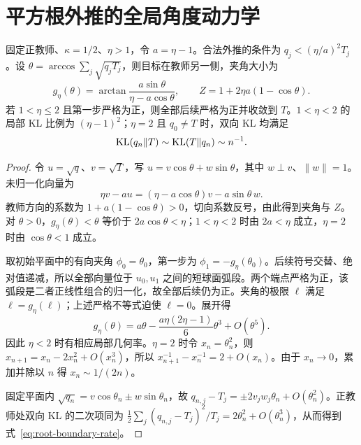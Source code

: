 \section{平方根外推的全局角度动力学}
\label{sec:root-extrapolation}
\begin{theorem}[平方根外推的角度映射与收敛]
\label{thm:root-extrapolation}
固定正教师、$\kappa=1/2$、$\eta>1$，令 $a=\eta-1$。合法外推的条件为 $q_j<(\eta/a)^2T_j$。设 $\theta=\arccos\sum_j\sqrt{q_jT_j}$，则目标在教师另一侧，夹角大小为
\begin{equation}
g_\eta(\theta)=\arctan\frac{a\sin\theta}{\eta-a\cos\theta},\qquad
Z=1+2\eta a(1-\cos\theta).
\label{eq:root-extrapolation-angle}
\end{equation}
若 $1<\eta\le2$ 且第一步严格为正，则全部后续严格为正并收敛到 $T$。$1<\eta<2$ 的局部 KL 比例为 $(\eta-1)^2$；$\eta=2$ 且 $q_0\ne T$ 时，双向 KL 均满足
\begin{equation}
\operatorname{KL}(q_n\Vert T)\sim\operatorname{KL}(T\Vert q_n)\sim n^{-1}.
\label{eq:root-boundary-rate}
\end{equation}
\end{theorem}
\begin{proof}
令 $u=\sqrt q$、$v=\sqrt T$，写 $u=v\cos\theta+w\sin\theta$，其中 $w\perp v$、$\|w\|=1$。未归一化向量为
\begin{equation}
\eta v-au=(\eta-a\cos\theta)v-a\sin\theta\,w.
\end{equation}
教师方向的系数为 $1+a(1-\cos\theta)>0$，切向系数反号，由此得到夹角与 $Z$。对 $\theta>0$，$g_\eta(\theta)<\theta$ 等价于 $2a\cos\theta<\eta$；$1<\eta<2$ 时由 $2a<\eta$ 成立，$\eta=2$ 时由 $\cos\theta<1$ 成立。

取初始平面中的有向夹角 $\phi_0=\theta_0$，第一步为 $\phi_1=-g_\eta(\theta_0)$。后续符号交替、绝对值递减，所以全部向量位于 $u_0,u_1$ 之间的短球面弧段。两个端点严格为正，该弧段是二者正线性组合的归一化，故全部后续仍为正。夹角的极限 $\ell$ 满足 $\ell=g_\eta(\ell)$；上述严格不等式迫使 $\ell=0$。展开得
\begin{equation}
g_\eta(\theta)=a\theta-\frac{a\eta(2\eta-1)}6\theta^3+O(\theta^5).
\end{equation}
因此 $\eta<2$ 时有相应局部几何率。$\eta=2$ 时令 $x_n=\theta_n^2$，则 $x_{n+1}=x_n-2x_n^2+O(x_n^3)$，所以 $x_{n+1}^{-1}-x_n^{-1}=2+O(x_n)$。由于 $x_n\to0$，累加并除以 $n$ 得 $x_n\sim1/(2n)$。

固定平面内 $\sqrt{q_n}=v\cos\theta_n\pm w\sin\theta_n$，故 $q_{n,j}-T_j=\pm2v_jw_j\theta_n+O(\theta_n^2)$。正教师处双向 KL 的二次项同为 $\frac12\sum_j(q_{n,j}-T_j)^2/T_j=2\theta_n^2+O(\theta_n^3)$，从而得到式~\eqref{eq:root-boundary-rate}。
\end{proof}


